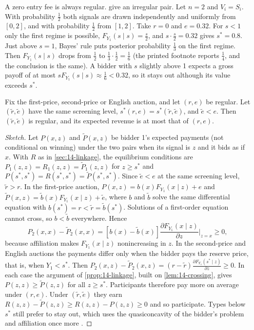 A zero entry fee is always regular. \citet[footnote~27]{MilgromWeber1982} give an irregular pair. Let $n=2$
and $V_i=S_i$. With probability $\frac{1}{2}$ both signals are drawn independently and uniformly from $[0,2]$,
and with probability $\frac{1}{2}$ from $[1,2]$. Take $r=0$ and $e=0.32$. For $s<1$ only the first regime is
possible, $F_{Y_1}(s\mid s)=\frac{s}{2}$, and $s\cdot\frac{s}{2}=0.32$ gives $s^*=0.8$. Just above $s=1$, Bayes'
rule puts posterior probability $\frac{1}{3}$ on the first regime. Then $F_{Y_1}(s\mid s)$ drops from
$\frac{1}{2}$ to $\frac{1}{3}\cdot\frac{1}{2}=\frac{1}{6}$ (the printed footnote reports $\frac{1}{4}$, and the
conclusion is the same). A bidder with $s$ slightly above 1 expects a gross payoff of at most
$sF_{Y_1}(s\mid s)\approx\frac{1}{6}<0.32$, so it stays out although its value exceeds $s^*$.

\begin{proposition}\label{prop:14-mw-fee}
Fix the first-price, second-price or English auction, and let $(r,e)$ be regular. Let $(\tilde r,\tilde e)$
have the same screening level, $s^*(r,e)=s^*(\tilde r,\tilde e)$, and $\tilde e<e$. Then $(\tilde r,\tilde e)$
is regular, and its expected revenue is at most that of $(r,e)$.
\end{proposition}

\begin{proof}[Sketch]
Let $P(x,z)$ and $\tilde P(x,z)$ be bidder 1's expected payments (not conditional on winning) under the two
pairs when its signal is $z$ and it bids as if $x$. With $R$ as in \cref{sec:14-linkage}, the equilibrium
conditions are $P_1(z,z)=R_1(z,z)=\tilde P_1(z,z)$ for $z\ge s^*$ and $P(s^*,s^*)=R(s^*,s^*)=\tilde
P(s^*,s^*)$. Since $\tilde e<e$ at the same screening level, $\tilde r>r$. In the first-price auction,
$P(x,z)=b(x)F_{Y_1}(x\mid z)+e$ and $\tilde P(x,z)=\tilde b(x)F_{Y_1}(x\mid z)+\tilde e$, where $b$ and
$\tilde b$ solve the same differential equation with $b(s^*)=r<\tilde r=\tilde b(s^*)$. Solutions of a
first-order equation cannot cross, so $b<\tilde b$ everywhere. Hence
\begin{equation*}
  P_2(x,x)-\tilde P_2(x,x)=\left[b(x)-\tilde b(x)\right]\frac{\partial F_{Y_1}(x\mid z)}{\partial z}\Big|_{z=x}\ge0,
\end{equation*}
because affiliation makes $F_{Y_1}(x\mid z)$ nonincreasing in $z$. In the second-price and English auctions the
payments differ only when the bidder pays the reserve price, that is, when $Y_1<s^*$. Then
$P_2(x,z)-\tilde P_2(x,z)=(r-\tilde r)\frac{\partial F_{Y_1}(s^*\mid z)}{\partial z}\ge0$. In each case the
argument of \cref{prop:14-linkage}, built on \cref{lem:14-crossing}, gives $P(z,z)\ge\tilde P(z,z)$ for all
$z\ge s^*$. Participants therefore pay more on average under $(r,e)$. Under $(\tilde r,\tilde e)$ they earn
$R(z,z)-\tilde P(z,z)\ge R(z,z)-P(z,z)\ge0$ and so participate. Types below $s^*$ still prefer to stay out,
which uses the quasiconcavity of the bidder's problem and affiliation once more
\citep[pp.~1113--1114]{MilgromWeber1982}.
\end{proof}

